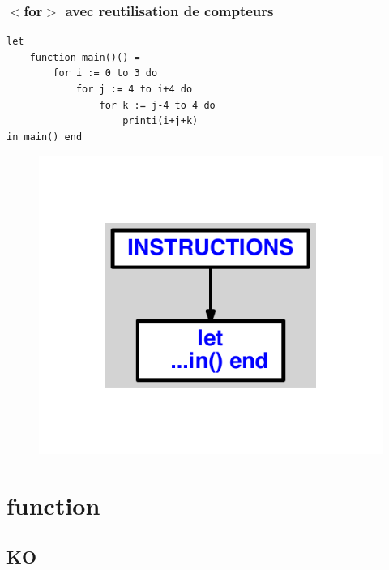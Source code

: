 \documentclass{article}
\begin{document}
\subsubsection{$ < $for$ > $ avec reutilisation de compteurs}
\begin{lstlisting}
let
	function main()() =
		for i := 0 to 3 do
			for j := 4 to i+4 do
				for k := j-4 to 4 do
					printi(i+j+k)
in main() end
\end{lstlisting}
\newpage
\begin{figure}[H]
\centering
\includegraphics[max width=\textwidth]{ast/ast_212.pdf}
\end{figure}
\newpage
\section{function}
\subsection{KO}
\end{document}
